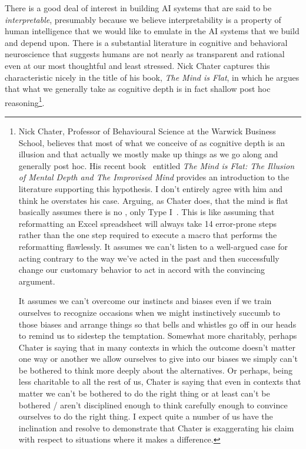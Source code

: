 There is a good deal of interest in building AI systems that are said to be {\it{interpretable}}, presumably because we believe interpretability is a property of human intelligence that we would like to emulate in the AI systems that we build and depend upon. There is a substantial literature in cognitive and behavioral neuroscience that suggests humans are not nearly as transparent and rational even at our most thoughtful and least stressed. Nick Chater captures this characteristic nicely in the title of his book, {\it{The Mind is Flat}}, in which he argues that what we generally take as cognitive depth is in fact shallow post hoc reasoning\footnote{%
%
  Nick Chater, Professor of Behavioural Science at the Warwick Business School, believes that most of what we conceive of as cognitive depth is an illusion and that actually we mostly make up things as we go along and generally post hoc. His recent book~\cite{Chater2018} entitled {\it{The Mind is Flat: The Illusion of Mental Depth and The Improvised Mind}} provides an introduction to the literature supporting this hypothesis. I don't entirely agree with him and think he overstates his case. Arguing, as Chater does, that the mind is flat basically assumes there is no {}, only Type I~\cite{Kahneman2011}. This is like assuming that reformatting an Excel spreadsheet will always take 14 error-prone steps rather than the one step required to execute a macro that performs the reformatting flawlessly. It assumes we can't listen to a well-argued case for acting contrary to the way we've acted in the past and then successfully change our customary behavior to act in accord with the convincing argument. 

  It assumes we can't overcome our instincts and biases even if we train ourselves to recognize occasions when we might instinctively succumb to those biases and arrange things so that bells and whistles go off in our heads to remind us to sidestep the temptation. Somewhat more charitably, perhaps Chater is saying that in many contexts in which the outcome doesn't matter one way or another we allow ourselves to give into our biases \emdash{} we simply can't be bothered to think more deeply about the alternatives. Or perhaps, being less charitable to all the rest of us, Chater is saying that even in contexts that matter we can't be bothered to do the right thing \emdash{} or at least can't be bothered / aren't disciplined enough to think carefully enough to convince ourselves to do the right thing. I expect quite a number of us have the inclination and resolve to demonstrate that Chater is exaggerating his claim with respect to situations where it makes a difference.}.

